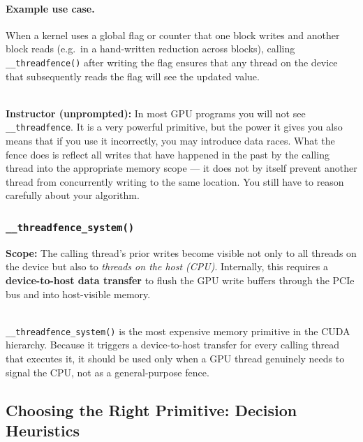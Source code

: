 \paragraph{Example use case.}
When a kernel uses a global flag or counter that one block writes and another
block reads (e.g.\ in a hand-written reduction across blocks), calling
\texttt{\_\_threadfence()} after writing the flag ensures that any thread on
the device that subsequently reads the flag will see the updated value.

\begin{ppnote}
  \\\textbf{Instructor (unprompted):} In most GPU programs you will not see
  \texttt{\_\_threadfence}. It is a very powerful primitive, but the power it
  gives you also means that if you use it incorrectly, you may introduce data
  races. What the fence does is reflect all writes that have happened in the
  past by the calling thread into the appropriate memory scope --- it does not
  by itself prevent another thread from concurrently writing to the same
  location. You still have to reason carefully about your algorithm.
\end{ppnote}

\subsubsection{\texttt{\_\_threadfence\_system()}}


\textbf{Scope:} The calling thread's prior writes become visible not only to
all threads on the device but also to \emph{threads on the host (CPU)}.
Internally, this requires a \textbf{device-to-host data transfer} to flush
the GPU write buffers through the PCIe bus and into host-visible memory.

\begin{pppitfall}
  \\\texttt{\_\_threadfence\_system()} is the most expensive memory primitive in
  the CUDA hierarchy. Because it triggers a device-to-host transfer for every
  calling thread that executes it, it should be used only when a GPU thread
  genuinely needs to signal the CPU, not as a general-purpose fence.
\end{pppitfall}



\subsection{Choosing the Right Primitive: Decision Heuristics}
\label{subsec:choosing}

